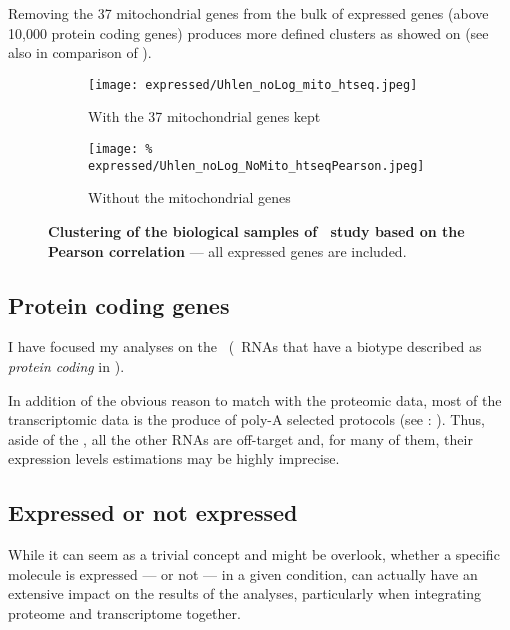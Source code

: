 Removing the 37 mitochondrial genes from the bulk of expressed genes
(above 10,000 protein coding genes) produces more defined clusters as showed on
 (see also  in comparison
of ).

\begin{figure}[!htb]
    \centering
    \begin{subfigure}[h]{0.85\textwidth}
        \centering
        \texttt{[image: expressed/Uhlen\_noLog\_mito\_htseq.jpeg]}
        \caption{With the 37 mitochondrial genes kept}\label{fig:withMito}
    \end{subfigure}

    \begin{subfigure}[h]{0.85\textwidth}
        \centering
        \texttt{[image: \%
            expressed/Uhlen\_noLog\_NoMito\_htseqPearson.jpeg]}
        \caption{Without the mitochondrial genes}\label{fig:NoMito}
    \end{subfigure}
    \caption[Clustering of the biological samples of \uhlen\
    dataset based on the Pearson correlation]{\label{fig:MitoNomito}\textbf{Clustering
    of the biological samples of \uhlen\ study based on the Pearson correlation}
    --- all expressed genes are included.}
\end{figure}

\subsection{Protein coding genes}\label{subsec:protcodingOnly}
I have focused my analyses on the \mRNAs\ (\ie\ \glspl{RNA} that have a
biotype described as \emph{protein coding} in \ens{76}).

In addition of the obvious reason to match with the proteomic data,
most of the transcriptomic data is the produce of poly-A selected protocols
(see \Cref{msec:polyA}: \nameref{msec:polyA}).
Thus, aside of the \mRNAs, all the other \glspl{RNA} are off-target
and, for many of them,
their expression levels estimations may be highly imprecise.


\subsection{Expressed or not expressed}
\label{sec:ExpressedOrNot}

While it can seem as a trivial concept and might be overlook, whether a specific
molecule is expressed --- or not --- in a given condition, can actually have
an extensive impact on the results of the analyses, particularly when integrating
proteome and transcriptome together.

